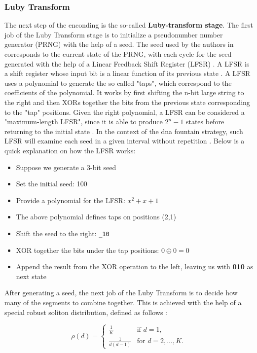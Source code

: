 \documentclass[12pt]%
{article}
\begin{document}
\subsubsection{Luby Transform}
The next step of the enconding is the so-called \textbf{Luby-transform stage}. The first job of the Luby Transform stage is to initialize a pseudonumber number generator (PRNG) with the help of a seed. The seed used by the authors in \cite{erlich2017dnasupplementary} corresponds to the current state of the PRNG, with each cycle for the seed generated with the help of a Linear Feedback Shift Register (LFSR) \cite{erlich2017dnasupplementary}. A LFSR is a shift register whose input bit is a linear function of its previous state \cite{hathwalia2014design}. A LFSR uses a polynomial to generate the so called "taps", which correspond to the coefficients of the polynomial. It works by first shifting the n-bit large string to the right and then XORs together the bits from the previous state corresponding to the "tap" positions. Given the right polynomial, a LFSR can be considered a "maximum-length LFSR", since it is able to produce \(2^{n}-1\) states before returning to the initial state \cite{hathwalia2014design}. In the context of the dna fountain strategy, such LFSR will examine each seed in a given interval without repetition \cite{erlich2017dnasupplementary}. Below is a quick explanation on how the LFSR works: 

\begin{itemize}
\item Suppose we generate a 3-bit seed
\item Set the initial seed: 100
\item Provide a polynomial for the LFSR: \(x^{2} + x + 1\)
\item The above polynomial defines taps on positions (2,1)
\item Shift the seed to the right:  \texttt{\_10}
\item XOR together the bits under the tap positions: \(0 \oplus 0 = 0\)
\item Append the result from the XOR operation to the left, leaving us with \textbf{010} as next state 
\end{itemize}

After generating a seed, the next job of the Luby Transform is to decide how many of the segments to combine together. This is achieved with the help of a special robust soliton distribution, defined as follows \cite{erlich2017dnasupplementary}:   

\[
\rho(d) = 
\begin{cases} 
\frac{1}{K} & \text{if } d = 1, \\
\frac{1}{d(d-1)} & \text{for } d = 2, \dots, K.
\end{cases}
\]
\end{document}
